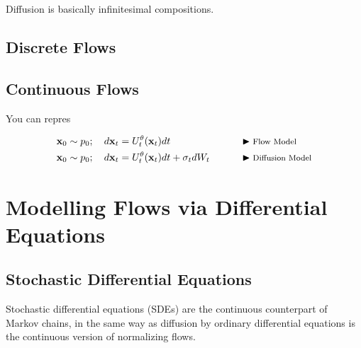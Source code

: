 \documentclass[a4paper, 11pt]{article}
\begin{document}
\begin{center} 
\end{center} 


Diffusion is basically infinitesimal compositions.

\subsection{Discrete Flows}

\subsection{Continuous Flows}

You can repres

\begin{align}
    \mbox{$\mbox{$\mathbf{x}$}$}_0 \sim p_0; \quad d\mbox{$\mbox{$\mathbf{x}$}$}_t &= U_t^{\theta}(\mbox{$\mbox{$\mathbf{x}$}$}_t) dt &&\qquad \blacktriangleright\text{\footnotesize Flow Model} \\
    \mbox{$\mbox{$\mathbf{x}$}$}_0 \sim p_0; \quad d\mbox{$\mbox{$\mathbf{x}$}$}_t &= U_t^{\theta}(\mbox{$\mbox{$\mathbf{x}$}$}_t) dt + \sigma_t dW_t && \qquad \blacktriangleright\text{\footnotesize Diffusion Model}
\end{align}


\section{Modelling Flows via Differential Equations}

\subsection{Stochastic Differential Equations}
Stochastic differential equations (SDEs) are the continuous counterpart of Markov chains, in the same way
as diffusion by ordinary differential equations is the continuous version of normalizing flows.
\end{document}
